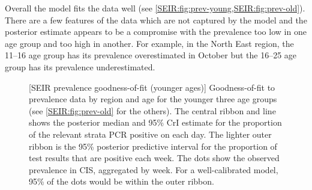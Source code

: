 \documentclass[thesis.tex]{subfiles}
\begin{document}
Overall the model fits the data well (see \cref{SEIR:fig:prev-young,SEIR:fig:prev-old}).
There are a few features of the data which are not captured by the model and the posterior estimate appears to be a compromise with the prevalence too low in one age group and too high in another.
For example, in the North East region, the 11--16 age group has its prevalence overestimated in October but the 16--25 age group has its prevalence underestimated.
\begin{figure}
    \vspace{-3cm}
    \captionsetup{width=0.8\paperwidth}
    [SEIR prevalence goodness-of-fit (younger ages)]{%
        Goodness-of-fit to prevalence data by region and age for the younger three age groups (see \cref{SEIR:fig:prev-old} for the others).
        The central ribbon and line shows the posterior median and 95\% CrI estimate for the proportion of the relevant strata PCR positive on each day.
        The lighter outer ribbon is the 95\% posterior predictive interval for the proportion of test results that are positive each week.
        The dots show the observed prevalence in CIS, aggregated by week.
        For a well-calibrated model, 95\% of the dots would be within the outer ribbon.
    }
    \label{SEIR:fig:prev-young}
\end{figure}
\end{document}
